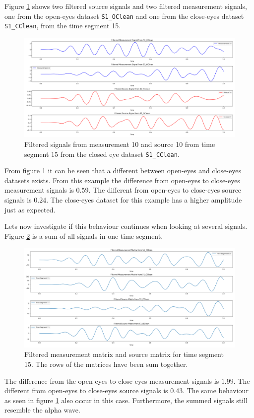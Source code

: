 Figure \ref{fig:dft_2} shows two filtered source signals and two filtered measurement signals, one from the open-eyes dataset \texttt{S1\_OClean} and one from the close-eyes dataset \texttt{S1\_CClean}, from the time segment 15.
\begin{figure}[H]
\centering
\includegraphics[scale=0.28]{figures/ch_7/DFT_plot_X_and_Y_signal_timeseg15_source10.png}
\caption{Filtered signals from measurement 10 and source 10 from time segment 15 from the closed eye dataset \texttt{S1\_CClean}.}
\label{fig:dft_2}
\end{figure}
\noindent
From figure \ref{fig:dft_2} it can be seen that a different between open-eyes and close-eyes datasets exists. From this example the difference from open-eyes to close-eyes measurement signals is $0.59$. The different from open-eyes to close-eyes source signals is $0.24$.
The close-eyes dataset for this example has a higher amplitude just as expected. 

Lets now investigate if this behaviour continues when looking at several signals. Figure \ref{fig:dft_3} is a sum of all signals in one time segment.
\begin{figure}[H]
\centering
\includegraphics[scale=0.28]{figures/ch_7/DFT_plot_X_and_Y_matrix_timeseg15.png}
\caption{Filtered measurement matrix and source matrix for time segment 15. The rows of the matrices have been sum together.}
\label{fig:dft_3}
\end{figure}
\noindent
The difference from the open-eyes to close-eyes measurement signals is $1.99$. The different from open-eyes to close-eyes source signals is $0.43$. The same behaviour as seen in figure \ref{fig:dft_2} also occur in this case. Furthermore, the summed signals still resemble the alpha wave. 

